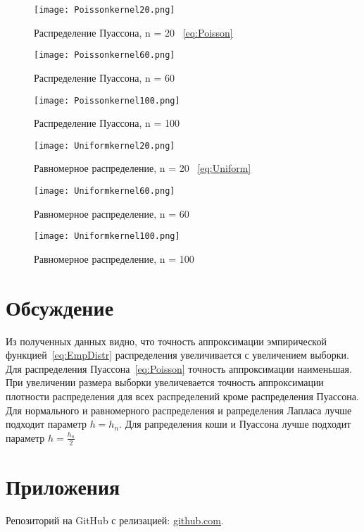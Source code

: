 \documentclass[12pt,a4paper]{scrartcl}
\begin{document}
\begin{figure}[H]
  \centering
  \texttt{[image: Poissonkernel20.png]}
  \caption{Распределение Пуассона, n = 20 ~\eqref{eq:Poisson}}
\end{figure}

\begin{figure}[H]
  \centering
  \texttt{[image: Poissonkernel60.png]}
  \caption{Распределение Пуассона, n = 60}
\end{figure}

\begin{figure}[H]
  \centering
  \texttt{[image: Poissonkernel100.png]}
  \caption{Распределение Пуассона, n = 100}
\end{figure}

\begin{figure}[H]
  \centering
  \texttt{[image: Uniformkernel20.png]}
  \caption{Равномерное распределение, n = 20 ~\eqref{eq:Uniform}}
\end{figure}

\begin{figure}[H]
  \centering
  \texttt{[image: Uniformkernel60.png]}
  \caption{Равномерное распределение, n = 60}
\end{figure}

\begin{figure}[H]
  \centering
  \texttt{[image: Uniformkernel100.png]}
  \caption{Равномерное распределение, n = 100}
\end{figure}

\section{Обсуждение}
Из полученных данных видно, что точность аппроксимации эмпирической функцией~\eqref{eq:EmpDistr} распределения увеличивается с увеличением выборки. Для распределения Пуассона~\eqref{eq:Poisson} точность аппроксимации наименьшая. При увеличении размера выборки увеличевается точность аппроксимации плотности распределения для всех распределений кроме распределения Пуассона. Для нормального и равномерного распределения и рапределения Лапласа лучше подходит параметр $h = h_n$. Для рапределения коши и Пуассона лучше подходит параметр $h = \frac{h_n}{2}$

\section{Приложения}
Репозиторий на GitHub с релизацией: \href{https://github.com/WiillyWonka/MatStat}{github.com}.
\end{document}
